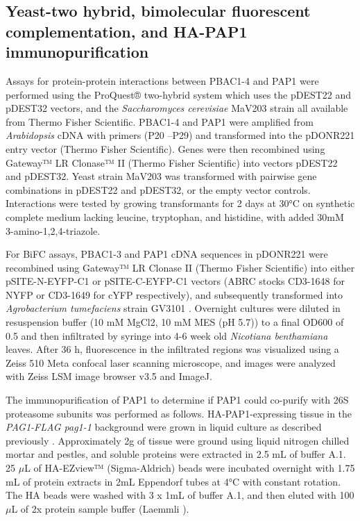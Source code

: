 \subsection{Yeast-two hybrid, bimolecular fluorescent complementation, and HA-PAP1 immunopurification}
	Assays for protein-protein interactions between PBAC1-4 and PAP1 were performed using the ProQuest® two-hybrid system which uses the pDEST22 and pDEST32 vectors, and the \textit{Saccharomyces cerevisiae} MaV203 strain \citep{vidal96} all available from Thermo Fisher Scientific. PBAC1-4 and PAP1 were amplified from \textit{Arabidopsis} cDNA with primers (P20 –P29) and transformed into the pDONR221 entry vector (Thermo Fisher Scientific). Genes were then recombined using Gateway™ LR Clonase™ II (Thermo Fisher Scientific) into vectors pDEST22 and pDEST32. Yeast strain MaV203 was transformed with pairwise gene combinations in pDEST22 and pDEST32, or the empty vector controls. Interactions were tested by growing transformants for 2 days at 30°C on synthetic complete medium lacking leucine, tryptophan, and histidine, with added 30mM 3-amino-1,2,4-triazole.
	
	For BiFC assays, PBAC1-3 and PAP1 cDNA sequences in pDONR221 were recombined using Gateway™  LR Clonase II (Thermo Fisher Scientific) into either pSITE-N-EYFP-C1 or pSITE-C-EYFP-C1 vectors \citep{martin09} (ABRC stocks CD3-1648 for NYFP or CD3-1649 for cYFP respectively), and subsequently transformed into \textit{Agrobacterium tumefaciens} strain GV3101 \citep{gelvin03}. Overnight cultures were diluted in resuspension buffer (10 mM MgCl2, 10 mM MES (pH 5.7)) to a final OD600 of 0.5 and then infiltrated by syringe into 4-6 week old \textit{Nicotiana benthamiana} leaves. After 36 h, fluorescence in the infiltrated regions was visualized using a Zeiss 510 Meta confocal laser scanning microscope, and images were analyzed with Zeiss LSM image browser v3.5 and ImageJ.
	
	The immunopurification of PAP1 to determine if PAP1 could co-purify with 26S proteasome subunits was performed as follows. HA-PAP1-expressing tissue in the \textit{PAG1-FLAG pag1-1} background were grown in liquid culture as described previously \citep{book10}. Approximately 2g of tissue were ground using liquid nitrogen chilled mortar and pestles, and soluble proteins were extracted in 2.5 mL of buffer A.1. 25 $\mu$L of HA-EZview™ (Sigma-Aldrich) beads were incubated overnight with 1.75 mL of protein extracts in 2mL Eppendorf tubes at 4°C with constant rotation. The HA beads were washed with 3 x 1mL of buffer A.1, and then eluted with 100$\mu$L of 2x protein sample buffer (Laemmli \citep{laemmli70}). 
	 
